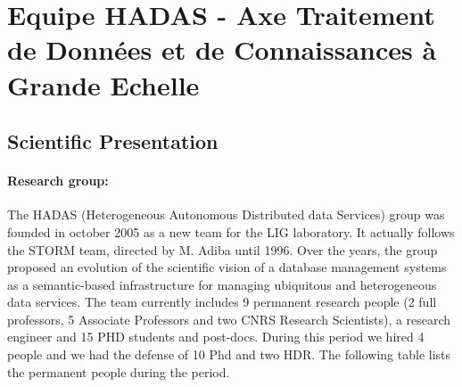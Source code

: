 

\section{Equipe HADAS - Axe Traitement de Donn{\'e}es et de Connaissances {\`a} Grande Echelle} 
\label{sec:hadas}

\subsection{Scientific Presentation} %
\label{sub:hadas_scientific_presentation}

\paragraph{Research group:}

The HADAS (Heterogeneous  Autonomous Distributed data Services) group was founded in october 2005 as a new team for the LIG laboratory. It actually follows the STORM team, directed by M. Adiba until 1996. 
Over the years, the group  proposed an evolution of the scientific vision of a database management systems  as  a semantic-based infrastructure for managing ubiquitous and heterogeneous data services. 
The team currently includes 9  permanent research people (2 full professors, 5 Associate Professors and two CNRS Research Scientists),  a research engineer and 15 PHD students and post-docs. During this period we hired 4 people and we had the defense of 10 Phd and two HDR. The following table lists the permanent people during the period. 


